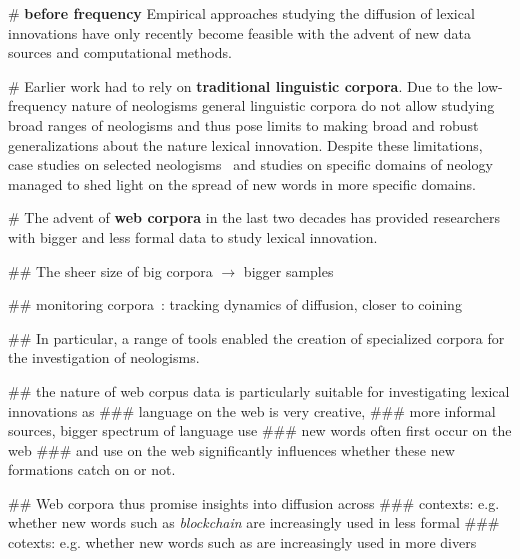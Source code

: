 \documentclass[
  a4paper,
  abstract=on,
  captions=tableabove
  ]{scrartcl}
\renewcommand{\hw}[1]{\textbf{#1}}
\begin{document}
  \begin{easylist}[itemize]

  # \hw{before frequency} Empirical approaches studying the diffusion of lexical innovations have only recently become feasible with the advent of new data sources and computational methods.

  # Earlier work had to rely on \hw{traditional linguistic corpora}. Due to the low-frequency nature of neologisms general linguistic corpora do not allow studying broad ranges of neologisms and thus pose limits to making broad and robust generalizations about the nature lexical innovation. Despite these limitations, case studies on selected neologisms~\parencite{Hohenhaus2006BouncebackabilityWebascorpusbased} and studies on specific domains of neology~\parencite{Elsen2004Neologismen} managed to shed light on the spread of new words in more specific domains.

  # The advent of \hw{web corpora} in the last two decades has provided researchers with bigger and less formal data to study lexical innovation.

  ## The sheer size of big corpora $\rightarrow$ bigger samples

  ## monitoring corpora~\parencite{Davies2013CorpusNews}: tracking dynamics of diffusion, closer to coining

  ## In particular, a range of tools enabled the creation of specialized corpora for the investigation of neologisms.~\parencite{Renouf2006WebCorpIntegrated, Kerremans2012NeoCrawlerIdentifying,LemnitzerWortwarte,Gerard2017LogoscopeSemiautomatic,Cartier2017NeoveilleWeb}

  ## the nature of web corpus data is particularly suitable for investigating lexical innovations as
  ### language on the web is very creative,
  ### more informal sources, bigger spectrum of language use
  ### new words often first occur on the web
  ### and use on the web significantly influences whether these new formations catch on or not.

  ## Web corpora thus promise insights into diffusion across
  ### contexts: e.g. whether new words such as \emph{blockchain} are increasingly used in less formal
  ### cotexts: e.g. whether new words such as \emph{} are increasingly used in more divers



  \end{easylist}
\end{document}
